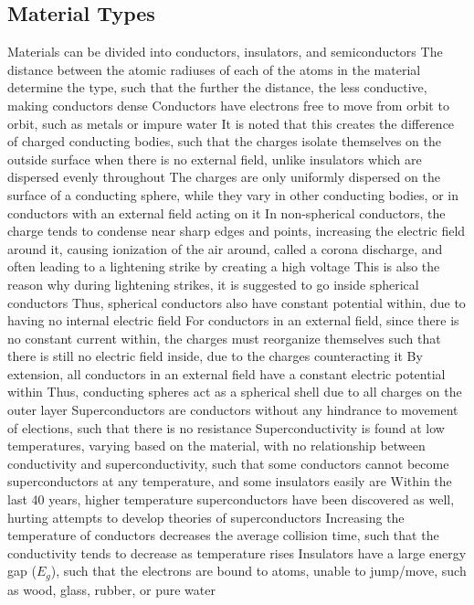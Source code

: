 \documentclass[11 pt, twoside]{article}
\newenvironment{outline*}
{
	\begin{outline}[enumerate]
	}
	{\end{outline}
}
\begin{document}
\subsection{Material Types}
\begin{outline*}
\1 Materials can be divided into conductors, insulators, and semiconductors
\2 The distance between the atomic radiuses of each of the atoms in the material determine the type, such that the further the distance, the less conductive, making conductors dense
\1 Conductors have electrons free to move from orbit to orbit, such as metals or impure water
\2 It is noted that this creates the difference of charged conducting bodies, such that the charges isolate themselves on the outside surface when there is no external field, unlike insulators which are dispersed evenly throughout
\3 The charges are only uniformly dispersed on the surface of a conducting sphere, while they vary in other conducting bodies, or in conductors with an external field acting on it
\3 In non-spherical conductors, the charge tends to condense near sharp edges and points, increasing the electric field around it, causing ionization of the air around, called a corona discharge, and often leading to a lightening strike by creating a high voltage
\3 This is also the reason why during lightening strikes, it is suggested to go inside spherical conductors
\3 Thus, spherical conductors also have constant potential within, due to having no internal electric field
\2 For conductors in an external field, since there is no constant current within, the charges must reorganize themselves such that there is still no electric field inside, due to the charges counteracting it
\3 By extension, all conductors in an external field have a constant electric potential within
\2 Thus, conducting spheres act as a spherical shell due to all charges on the outer layer
\1 Superconductors are conductors without any hindrance to movement of elections, such that there is no resistance
\2 Superconductivity is found at low temperatures, varying based on the material, with no relationship between conductivity and superconductivity, such that some conductors cannot become superconductors at any temperature, and some insulators easily are
\2 Within the last 40 years, higher temperature superconductors have been discovered as well, hurting attempts to develop theories of superconductors
\2 Increasing the temperature of conductors decreases the average collision time, such that the conductivity tends to decrease as temperature rises
\1 Insulators have a large energy gap ($E_g$), such that the electrons are bound to atoms, unable to jump/move, such as wood, glass, rubber, or pure water

\end{outline*}
\end{document}
